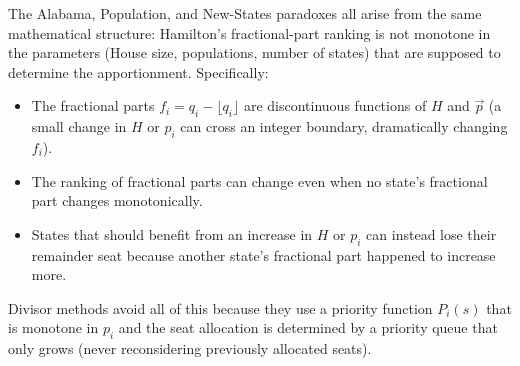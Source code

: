 The Alabama, Population, and New-States paradoxes all arise from
the same mathematical structure: Hamilton's fractional-part ranking
is not monotone in the parameters (House size, populations, number
of states) that are supposed to determine the apportionment.
Specifically:
\begin{itemize}
  \item The fractional parts $f_i = q_i - \lfloor q_i \rfloor$
    are discontinuous functions of $H$ and $\vec{p}$
    (a small change in $H$ or $p_i$ can cross an integer boundary,
    dramatically changing $f_i$).
  \item The ranking of fractional parts can change even when no state's
    fractional part changes monotonically.
  \item States that should benefit from an increase in $H$ or $p_i$
    can instead lose their remainder seat because another state's
    fractional part happened to increase more.
\end{itemize}
Divisor methods avoid all of this because they use a priority function
$P_i(s)$ that is monotone in $p_i$ and the seat allocation is determined
by a priority queue that only grows (never reconsidering previously
allocated seats).
